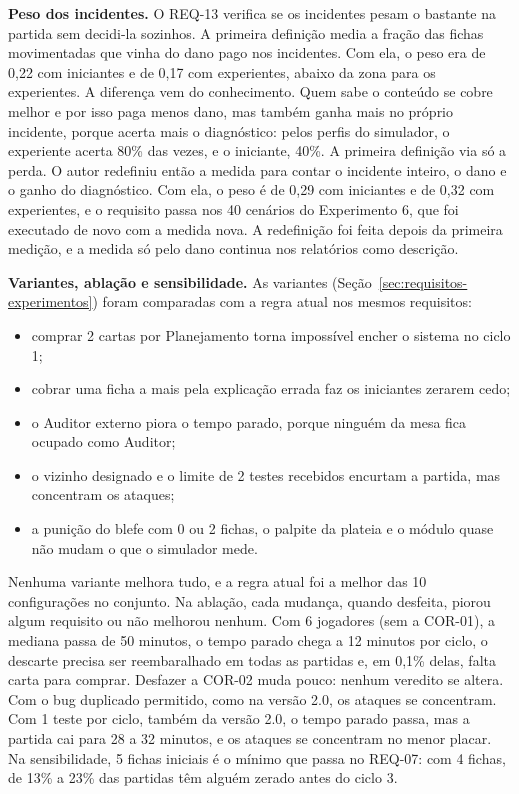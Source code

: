 \textbf{Peso dos incidentes.} O REQ-13 verifica se os incidentes pesam o bastante na partida sem decidi-la
sozinhos. A primeira definição media a fração das fichas movimentadas que vinha do dano pago nos incidentes. Com
ela, o peso era de 0,22 com iniciantes e de 0,17 com experientes, abaixo da zona para os experientes. A diferença
vem do conhecimento. Quem sabe o conteúdo se cobre melhor e por isso paga menos dano, mas também ganha mais no
próprio incidente, porque acerta mais o diagnóstico: pelos perfis do simulador, o experiente acerta 80\% das
vezes, e o iniciante, 40\%. A primeira definição via só a perda. O autor redefiniu então a medida para contar o
incidente inteiro, o dano e o ganho do diagnóstico. Com ela, o peso é de 0,29 com iniciantes e de 0,32 com
experientes, e o requisito passa nos 40 cenários do Experimento 6, que foi executado de novo com a medida nova. A
redefinição foi feita depois da primeira medição, e a medida só pelo dano continua nos relatórios como descrição.

\textbf{Variantes, ablação e sensibilidade.} As variantes (Seção~\ref{sec:requisitos-experimentos}) foram comparadas com a
regra atual nos mesmos requisitos:
\begin{itemize}
  \item comprar 2 cartas por Planejamento torna impossível encher o sistema no ciclo 1;
  \item cobrar uma ficha a mais pela explicação errada faz os iniciantes zerarem cedo;
  \item o Auditor externo piora o tempo parado, porque ninguém da mesa fica ocupado como Auditor;
  \item o vizinho designado e o limite de 2 testes recebidos encurtam a partida, mas concentram os ataques;
  \item a punição do blefe com 0 ou 2 fichas, o palpite da plateia e o módulo quase não mudam o que o simulador
    mede.
\end{itemize}
Nenhuma variante melhora tudo, e a regra atual foi a melhor das 10 configurações no conjunto. Na ablação, cada
mudança, quando desfeita, piorou algum requisito ou não melhorou nenhum. Com 6 jogadores (sem a COR-01), a
mediana passa de 50 minutos, o tempo parado chega a 12 minutos por ciclo, o descarte precisa ser
reembaralhado em todas as partidas e, em 0,1\% delas, falta carta para comprar. Desfazer a COR-02 muda pouco:
nenhum veredito se altera. Com o bug duplicado permitido, como na
versão 2.0, os ataques se concentram. Com 1 teste por ciclo, também da versão 2.0, o tempo parado passa,
mas a partida cai para 28 a 32 minutos, e os ataques se concentram no menor placar. Na sensibilidade, 5 fichas iniciais é o mínimo que passa no REQ-07: com 4
fichas, de 13\% a 23\% das partidas têm alguém zerado antes do ciclo 3.


